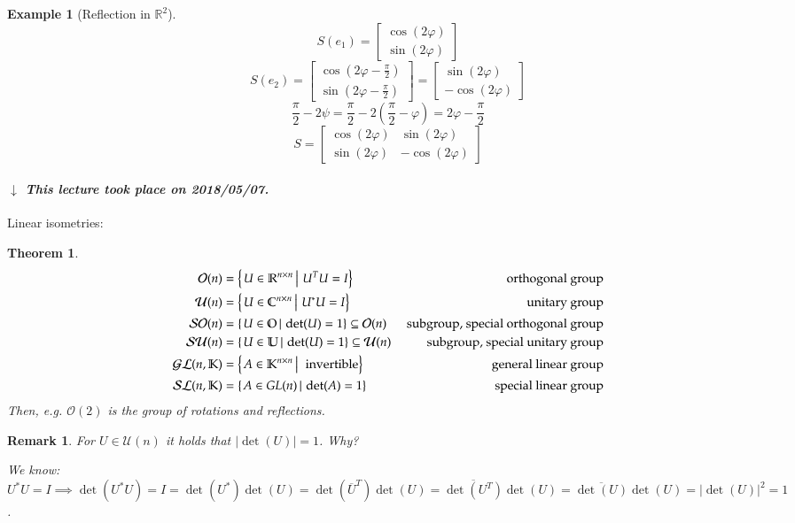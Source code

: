 \documentclass[a4paper]{article}
\newcounter{lecref}[section]
\numberwithin{lecref}{section}
\newtheorem{theorem}[lecref]{Theorem}
\newtheorem*{Example}{Example}
\newtheorem*{Remark}{Remark}
\newcommand{\setdef}[2]{\left\{\left.#1\,\right|\,#2\right\}}
\newcommand{\card}[1]{\left|#1\right|}
\newcommand{\dateref}[1]{%
  \begin{mdframed}[backgroundcolor=gray!10,innerbottommargin=0pt,innertopmargin=0pt]
    \paragraph{\textit{$\downarrow$ This lecture took place on #1.}}%
  \end{mdframed}%
}
\begin{document}
\begin{Example}[Reflection in $\mathbb R^2$]
  \[ S(e_1) = \begin{bmatrix} \cos(2\varphi) \\ \sin(2\varphi) \end{bmatrix} \]
  \[ S(e_2) = \begin{bmatrix} \cos(2\varphi - \frac\pi2) \\ \sin(2\varphi - \frac\pi2) \end{bmatrix} = \begin{bmatrix} \sin(2\varphi) \\ -\cos(2\varphi) \end{bmatrix} \]
  \[ \frac\pi2 - 2\psi = \frac\pi2 - 2\left(\frac\pi2 - \varphi\right) = 2\varphi - \frac\pi2 \]
  \[ S = \begin{bmatrix} \cos(2\varphi) & \sin(2\varphi) \\ \sin(2\varphi) & -\cos(2\varphi) \end{bmatrix} \]
\end{Example}

\dateref{2018/05/07}

Linear isometries:

\begin{theorem} %
  \begin{align*}
    \mathcal O(n) &= \setdef{U \in \mathbb R^{n\times n}}{U^TU = I} & \text{ orthogonal group} \\
    \mathcal U(n) &= \setdef{U \in \mathbb C^{n\times n}}{U^*U = I} & \text{ unitary group} \\
    \mathcal{SO}(n) &= \setdef{U \in \mathbb O}{\det(U) = 1} \subseteq \mathcal O(n) & \text{ subgroup, special orthogonal group} \\
    \mathcal{SU}(n) &= \setdef{U \in \mathbb U}{\det(U) = 1} \subseteq \mathcal U(n) & \text{ subgroup, special unitary group} \\
    \mathcal{GL}(n, \mathbb K) &= \setdef{A \in \mathbb K^{n\times n}}{\text{ invertible}} & \text{ general linear group} \\
    \mathcal{SL}(n, \mathbb K) &= \setdef{A \in \mathbb \mathcal{GL}(n)}{\det(A) = 1} & \text{ special linear group}
  \end{align*}
  Then, e.g. $\mathcal O(2)$ is the group of rotations and reflections.
\end{theorem}

\begin{Remark}
  For $U \in \mathcal U(n)$ it holds that $\card{\det(U)} = 1$. Why?

  We know: $U^* U = I \implies \det(U^* U) = I = \det(U^*) \det(U) = \det(\overline{U}^T) \det(U) = \overline{\det(U^T)} \det(U) = \overline{\det(U)} \det(U) = \card{\det(U)}^2 = 1$.
\end{Remark}
\end{document}
